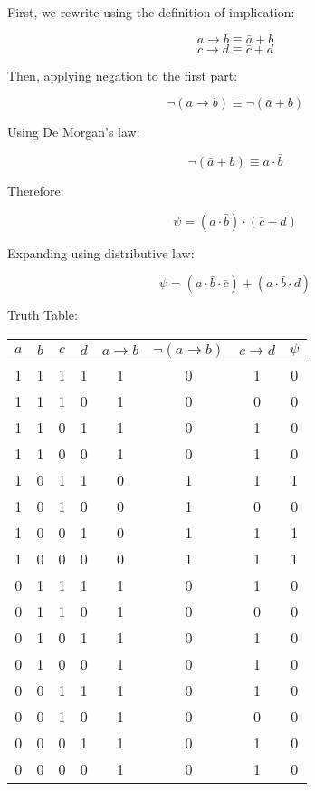 \documentclass[12pt,a4paper,openany]{article}
\begin{document}
First, we rewrite using the definition of implication:

$$a \to b \equiv \bar{a} + b$$
$$c \to d \equiv \bar{c} + d$$

Then, applying negation to the first part:

$$
\neg(a \to b) \equiv \neg(\bar{a} + b)
$$

Using De Morgan's law:

$$
\neg(\bar{a} + b) \equiv a \cdot \bar{b}
$$

Therefore:

$$
\psi = (a \cdot \bar{b}) \cdot (\bar{c} + d)
$$

Expanding using distributive law:

$$
\psi = (a \cdot \bar{b} \cdot \bar{c}) + (a \cdot \bar{b} \cdot d)
$$

Truth Table: 

\begin{center}
\begin{tabular}{|c|c|c|c|c|c|c|c|}
\hline
$a$ & $b$ & $c$ & $d$ & $a \to b$ & $\neg(a \to b)$ & $c \to d$ & $\psi$ \\
\hline
1 & 1 & 1 & 1 & 1 & 0 & 1 & 0 \\
\hline
1 & 1 & 1 & 0 & 1 & 0 & 0 & 0 \\
\hline
1 & 1 & 0 & 1 & 1 & 0 & 1 & 0 \\
\hline
1 & 1 & 0 & 0 & 1 & 0 & 1 & 0 \\
\hline
1 & 0 & 1 & 1 & 0 & 1 & 1 & 1 \\
\hline
1 & 0 & 1 & 0 & 0 & 1 & 0 & 0 \\
\hline
1 & 0 & 0 & 1 & 0 & 1 & 1 & 1 \\
\hline
1 & 0 & 0 & 0 & 0 & 1 & 1 & 1 \\
\hline
0 & 1 & 1 & 1 & 1 & 0 & 1 & 0 \\
\hline
0 & 1 & 1 & 0 & 1 & 0 & 0 & 0 \\
\hline
0 & 1 & 0 & 1 & 1 & 0 & 1 & 0 \\
\hline
0 & 1 & 0 & 0 & 1 & 0 & 1 & 0 \\
\hline
0 & 0 & 1 & 1 & 1 & 0 & 1 & 0 \\
\hline
0 & 0 & 1 & 0 & 1 & 0 & 0 & 0 \\
\hline
0 & 0 & 0 & 1 & 1 & 0 & 1 & 0 \\
\hline
0 & 0 & 0 & 0 & 1 & 0 & 1 & 0 \\
\hline
\end{tabular}
\end{center}
\end{document}
